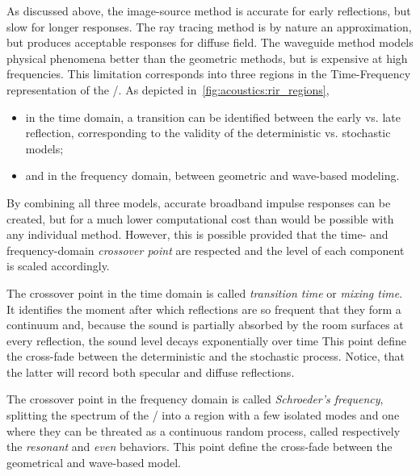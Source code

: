As discussed above, the image-source method is accurate for early reflections, but slow for longer responses.
The ray tracing method is by nature an approximation, but produces acceptable responses for diffuse field.
The waveguide method models physical phenomena better than the geometric methods, but is expensive at high frequencies.
This limitation corresponds into three regions in the Time-Frequency representation of the \RIR/.
As depicted in~\cref{fig:acoustics:rir_regions},
\begin{itemize}
    \item in the time domain, a transition can be identified between the early vs. late reflection, corresponding to the validity of the deterministic vs. stochastic models;
    \item and in the frequency domain, between geometric and wave-based modeling.
\end{itemize}

By combining all three models, accurate broadband impulse responses can be created,
but for a much lower computational cost than would be possible with any individual method.
However, this is possible provided that the time- and frequency-domain
\textit{crossover point} are respected and the level of each component is scaled accordingly.


The crossover point in the time domain is called \textit{transition time} or \textit{mixing time}.
It identifies the moment after which reflections are so frequent that they form a continuum and, because the sound is partially absorbed by the room surfaces at every reflection, the sound level decays exponentially over time \cite{Badeau2019common}
This point define the cross-fade between the deterministic and the stochastic process.
Notice, that the latter will record both specular and diffuse reflections.

The crossover point in the frequency domain is called \textit{Schroeder's frequency}, splitting the
spectrum of the \RIR/ into a region with a few isolated modes and one where they can be threated as a
continuous random process, called respectively the \textit{resonant} and \textit{even} behaviors.
This point define the cross-fade between the geometrical and wave-based model.

